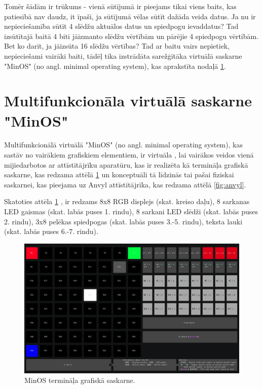 Tomēr šādām  ir trūkums - vienā sūtījumā ir
pieejams tikai viens baits, kas patiesībā nav daudz, it īpaši, ja sūtījumā vēlas
sūtīt dažāda veida datus. Ja nu ir nepieciešamība sūtīt 4 slēdžu aktuālos datus
un spiedpogu ievaddatus? Tad izsūtītajā baitā 4 biti jāizmanto slēdžu vērtībām
un pārējie 4 spiedpogu vērtībām. Bet ko darīt, ja jāizsūta 16 slēdžu vērtības?
Tad ar baitu vairs nepietiek, nepieciešami vairāki baiti, tādēļ tika izstrādāta
sarežģītāka virtuālā saskarne "MinOS" (no angl. minimal operating system), kas
aprakstīta nodaļā \ref{sec:vinminos}.

\section{Multifunkcionāla virtuālā saskarne "MinOS"}
\label{sec:vinminos}

Multifunkcionālā virtuālā  "MinOS" (no angl.
minimal operating system), kas sastāv no vairākiem grafiskiem elementiem, ir
virtuāla , lai vairākos veidos vienā
 mijiedarbotos ar attīstītājrīku aparatūru, kas ir
realizēta kā termināļa grafiskā saskarne, kas redzama attēlā \ref{fig:minosgui}
un konceptuāli tā līdzinās tai pašai fiziskai saskarnei, kas pieejama uz Anvyl
attīstītājrīka, kas redzama attēlā \ref{fig:anvyl}. 

Skatoties attēla \ref{fig:minosgui} , ir redzams
8x8 RGB displejs (skat. kreiso daļu), 8 sarkanas LED gaismas (skat. labās puses
1. rindu), 8 sarkani LED slēdži (skat. labās puses 2. rindu), 3x8 pelēkas
spiedpogas (skat. labās puses 3.-5. rindu), teksta lauki (skat. labās puses
6.-7. rindu). 

\begin{figure}[H]
    \includegraphics[width=1.0\linewidth]{assets/min-os-execution.png}
    \centering
    \caption{MinOS termināļa grafiskā saskarne.}
    \label{fig:minosgui}
\end{figure}

